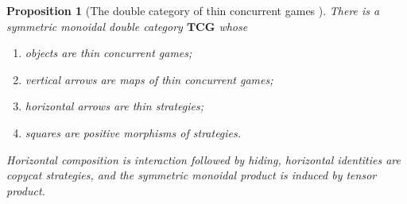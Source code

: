 \documentclass[oneside]{article}
\theoremstyle{plain}
\newtheorem{proposition}[theorem]{Proposition}
\theoremstyle{definition}
\theoremstyle{remark}
\begin{document}
\begin{proposition}[The double category of thin concurrent games {\cite[Prop.~5.11]{ClairambaultOlimpieriPaquet2025}}]
\label{prop:cgqg-background-tcg-double-category}
    There is a symmetric monoidal double category \(\mathbf{TCG}\) whose
    \begin{enumerate}[label=\textup{(\roman*)}]
        \item objects are thin concurrent games;
    
        \item vertical arrows are maps of thin concurrent games;
    
        \item horizontal arrows are thin strategies;
    
        \item squares are positive morphisms of strategies.
    \end{enumerate}
    Horizontal composition is interaction followed by hiding, horizontal identities are copycat strategies, and the symmetric monoidal product is induced by tensor product.
\end{proposition}
\end{document}
